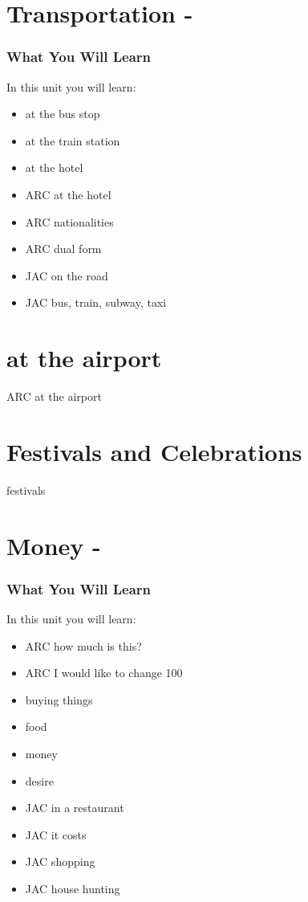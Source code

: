 \begin{multicols}
\chapter{Transportation - }
\subsection{What You Will Learn}
In this unit you will learn:
\begin{itemize}
\item at the bus stop
\item at the train station
\item at the hotel
\item ARC at the hotel
\item ARC nationalities
\item ARC dual form
\item JAC on the road
\item JAC bus, train, subway, taxi
\end{itemize}\newpage

\newpage{}
\chapter{at the airport}
ARC at the airport\\
\chapter{Festivals and Celebrations}
festivals\\
\index{}
\chapter{Money - }
\subsection{What You Will Learn}
In this unit you will learn:
\begin{itemize}
\item ARC how much is this?
\item ARC I would like to change 100
\item buying things
\item food
\item money
\item desire
\item JAC in a restaurant
\item JAC it costs
\item JAC shopping
\item JAC house hunting
\end{itemize}\newpage


\end{multicols}

